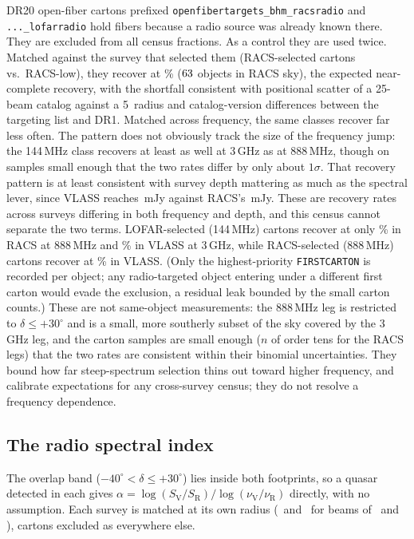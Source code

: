 \documentclass[twocolumn]{aastex631}
\newcommand{\code}[1]{\texttt{#1}}
\begin{document}
DR20 open-fiber cartons prefixed \code{openfibertargets\_bhm\_racsradio} and
\code{...\_lofarradio} hold fibers because a radio source was already known there. They are
excluded from all census fractions. As a control they are used twice. Matched against
the survey that selected them (RACS-selected cartons vs.\ RACS-low), they recover at
\drCartonRacsPct\% ($63$ objects in RACS sky), the expected near-complete
recovery, with the shortfall consistent with positional scatter of a 25\arcsec-beam
catalog against a 5\arcsec\ radius and catalog-version differences between the targeting
list and DR1. Matched across frequency, the same classes recover far less often. The pattern
does not obviously track the size of the frequency jump: the 144\,MHz class recovers at
least as well at 3\,GHz as at 888\,MHz, though on samples small enough that the two rates
differ by only about $1\sigma$. That recovery pattern is at least consistent with survey depth mattering
as much as the spectral lever, since VLASS reaches \drSlimVlass\,mJy against RACS's
\drSlimRacs\,mJy. These are recovery rates across surveys differing in both frequency
and depth, and this census cannot separate the two terms. LOFAR-selected (144\,MHz) cartons recover at only \drCartonLofarPct\%
in RACS at 888\,MHz and \drCartonVlassLofarPct\% in VLASS at 3\,GHz, while RACS-selected
(888\,MHz) cartons recover at \drCartonVlassRacsPct\% in VLASS. (Only the highest-priority
\code{FIRSTCARTON} is recorded per object; any radio-targeted object entering under a
different first carton would evade the exclusion, a residual leak bounded by the small
carton counts.) These are not same-object measurements: the 888\,MHz leg is restricted to
$\delta \le +30^\circ$ and is a small, more southerly subset of the sky covered by the
3\,GHz leg, and the carton samples are small enough ($n$ of order tens for the RACS legs)
that the two rates are consistent within their binomial uncertainties. They bound how far
steep-spectrum selection thins out toward higher frequency, and calibrate expectations for
any cross-survey census; they do not resolve a frequency dependence.

\subsection{The radio spectral index}
\label{sec:method-alpha}

The overlap band ($-40^\circ < \delta \le +30^\circ$) lies inside both footprints, so a
quasar detected in each gives $\alpha = \log(S_\mathrm{V}/S_\mathrm{R})/\log(\nu_\mathrm{V}/
\nu_\mathrm{R})$ directly, with no assumption. Each survey is matched at its own radius
(\drAlphaVlassRad\arcsec\ and \drAlphaRacsRad\arcsec\ for beams of \drAlphaVlassBeam\arcsec\
and \drAlphaRacsBeam\arcsec), cartons excluded as everywhere else.
\end{document}

